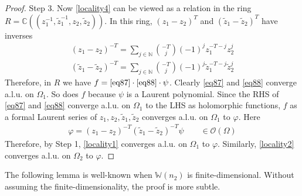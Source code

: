 \documentclass[11pt,b5paper,notitlepage]{article}
\theoremstyle{definition}
\theoremstyle{plain}
\newcommand{\mc}{\mathcal}
\newcommand{\wtd}{\widetilde}
\newcommand{\Wbb}{\mathbb W}
\newcommand{\Cbb}{\mathbb C}
\newcommand{\Nbb}{\mathbb N}
\newcommand{\<}{\left\langle}
\renewcommand{\>}{\right\rangle}
\numberwithin{equation}{section}
\begin{document}
\begin{proof}
Step 3. Now \eqref{locality4} can be viewed as a relation in the ring $R=\Cbb((z_1^{-1},\wtd z_1^{-1},z_2,\wtd z_2))$. In this ring, $(z_1-z_2)^T$ and $(\wtd z_1-\wtd z_2)^T$ have inverses
\begin{gather}
    (z_1-z_2)^{-T}=\sum_{j\in \Nbb}\binom{-T}{j}(-1)^j z_1^{-T-j}z_2^j  \label{eq87}\\
    (\wtd z_1-\wtd z_2)^{-T}=\sum_{j\in \Nbb}\binom{-T}{j}(-1)^j \wtd z_1^{-T-j}\wtd z_2^j \label{eq88}
\end{gather}
Therefore, in $R$ we have $f=\eqref{eq87}\cdot\eqref{eq88}\cdot\psi$. Clearly \eqref{eq87} and \eqref{eq88} converge a.l.u. on $\Omega_1$. So does $f$ because $\psi$ is a Laurent polynomial. Since the RHS of \eqref{eq87} and \eqref{eq88} converge a.l.u. on $\Omega_1$ to the LHS as holomorphic functions, $f$ as a formal Laurent series of $z_1,z_2,\wtd z_1,\wtd z_2$ converges a.l.u. on $\Omega_1$ to $\varphi$. Here
\begin{gather*}
\varphi=(z_1-z_2)^{-T} (\wtd z_1-\wtd z_2)^{-T}\psi\qquad\in\mc O(\Omega)
\end{gather*}
Therefore, by Step 1, \eqref{locality1} converges a.l.u. on $\Omega_1$ to $\varphi$. Similarly, \eqref{locality2} converges a.l.u. on $\Omega_2$ to $\varphi$.
\end{proof}

The following lemma is well-known when $\Wbb(n_2)$ is finite-dimensional. Without assuming the finite-dimensionality, the proof is more subtle.
\end{document}
